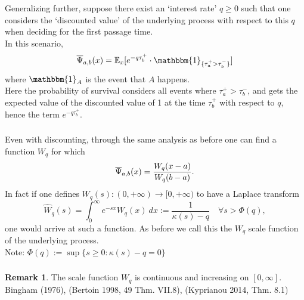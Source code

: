 \documentclass[xcolor=pdftex,dvipsnames,table]{beamer}
\theoremstyle{definition}
\newtheorem*{rmk}{Remark}
\begin{document}
\begin{frame}
\frametitle{\insertsectionhead}
Generalizing further, suppose there exist an `interest rate' $q \geq 0$ such that one considers the `discounted value' of the underlying process with respect to this $q$ when deciding for the  first passage time.\\
In this scenario,
\[ \sRui_{a,b}(x) = \mathbb{E}_x [ e^{-q \tau_b^+} \cdot \mathbbm{1}_{\{\tau_a^+ > \tau_b^-\}}] \]
where $\mathbbm{1}_{A}$ is the event that $A$ happens.\\
Here the probability of survival considers all events where $\tau_a^+ > \tau_b^-$, and gets the expected value of the discounted value of 1 at the time $\tau_b^+$ with respect to $q$, hence the term $e^{-q \tau_b^+}$.
\end{frame}

\begin{frame}
\frametitle{\insertsectionhead}
Even with discounting, through the same analysis as before one can find a function $W_q$ for which
\[ \overline{\Psi}_{a,b}(x) = \frac{W_q(x-a)}{W_q(b-a)}. \]
In fact if one defines $W_q(s): (0,+\infty) \rightarrow [0,+\infty)$ to have a Laplace transform
\[ \hat{W}_q(s) = \int_0^{\infty} e^{-sx} W_q(x) ~dx  := \frac{1}{\kappa(s) - q} \quad \forall s > \Phi (q), \]
one would arrive at such a function. As before we call this the $W_q$ scale function of the underlying process.\\
Note: $\Phi (q) := \sup \{ s\geq 0 : \kappa(s) - q = 0 \}$
\end{frame}

\begin{frame}
\frametitle{\insertsectionhead}
\begin{rmk}
The scale function $W_q$ is continuous and increasing on $[0,\infty]$. Bingham (1976), (Bertoin 1998, 49 Thm. VII.8), (Kyprianou 2014, Thm. 8.1)
\end{rmk}
\end{frame}
\end{document}
